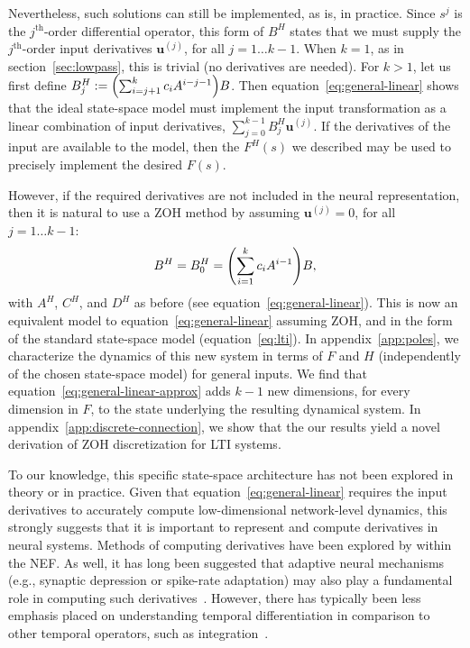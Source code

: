 \documentclass[12pt]{article}
\theoremstyle{definition}
\renewcommand{\vec}{\mathbf}  %
\let\originalleft\left
\let\originalright\right
\renewcommand{\left}{\mathopen{}\mathclose\bgroup\originalleft}
\renewcommand{\right}{\aftergroup\egroup\originalright}
\begin{document}
Nevertheless, such solutions can still be implemented, as is, in practice.
Since $s^j$ is the $j^{\text{th}}$-order differential operator, this form of $B^H$ states that we must supply the $j^{\text{th}}$-order input derivatives $\vec{u}^{(j)}$, for all $j = 1 \ldots k - 1$.
When $k = 1$, as in section~\ref{sec:lowpass}, this is trivial (no derivatives are needed).
For $k > 1$, let us first define $B^H_j:= \left( \sum_{i=j+1}^k c_i A^{i-j-1} \right) B$.
Then equation~\ref{eq:general-linear} shows that the ideal state-space model must implement the input transformation as a linear combination of input derivatives, $\sum_{j=0}^{k-1} B^H_j \vec{u}^{(j)}$.
If the derivatives of the input are available to the model, then the $F^{H}(s)$ we described may be used to precisely implement the desired $F(s)$.

However, if the required derivatives are not included in the neural representation, then it is natural to use a ZOH method by assuming $\vec{u}^{(j)} = 0$, for all $j = 1 \ldots k - 1$:
\begin{equation} \label{eq:general-linear-approx}
B^H = B^H_0 =  \left( \sum_{i=1}^k c_i A^{i-1} \right) B \text{,}
\end{equation}
with $A^H$, $C^H$, and $D^H$ as before (see equation~\ref{eq:general-linear}).
This is now an equivalent model to equation~\ref{eq:general-linear} assuming ZOH, and in the form of the standard state-space model (equation~\ref{eq:lti}).
In appendix~\ref{app:poles}, we characterize the dynamics of this new system in terms of $F$ and $H$ (independently of the chosen state-space model) for general inputs.
We find that equation~\ref{eq:general-linear-approx} adds $k - 1$ new dimensions, for every dimension in $F$, to the state underlying the resulting dynamical system.
In appendix~\ref{app:discrete-connection}, we show that the our results yield a novel derivation of ZOH discretization for LTI systems.

To our knowledge, this specific state-space architecture has not been explored in theory or in practice.
Given that equation~\ref{eq:general-linear} requires the input derivatives to accurately compute low-dimensional network-level dynamics, this strongly suggests that it is important to represent and compute derivatives in neural systems.
Methods of computing derivatives have been explored by \citet{tripp2010} within the NEF.
As well, it has long been suggested that adaptive neural mechanisms (e.g., synaptic depression or spike-rate adaptation) may also play a fundamental role in computing such derivatives~\citep{abbott2004synaptic, lundstrom2008fractional}.
However, there has typically been less emphasis placed on understanding temporal differentiation in comparison to other temporal operators, such as integration~\citep{tripp2010}.
\end{document}
